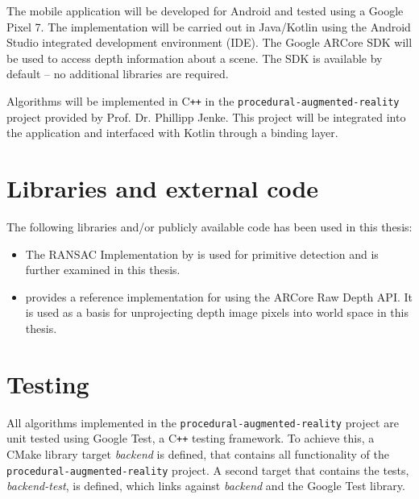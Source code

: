 The mobile application will be developed for Android and tested using a Google Pixel 7.
The implementation will be carried out in Java/Kotlin using the Android Studio integrated development environment (IDE).
The Google ARCore SDK will be used to access depth information about a scene.
The SDK is available by default -- no additional libraries are required.

Algorithms will be implemented in C\texttt{++} in the \texttt{procedural-augmented-reality} project provided by Prof. Dr. Phillipp Jenke.
This project will be integrated into the application and interfaced with Kotlin through a binding layer.

\section{Libraries and external code}
The following libraries and/or publicly available code has been used in this thesis:
\begin{itemize}
    \item The RANSAC Implementation by \citeauthor{schnabel_efficient_2007} is used for primitive detection
    and is further examined in this thesis. \parencite{schnabel_efficient_2007}
    \item {} provides a reference implementation for using the ARCore Raw Depth API.
    It is used as a basis for unprojecting depth image pixels into world space in this thesis.~\parencite{google_llc_codelab_raw_depth}
\end{itemize}

\section{Testing}

All algorithms implemented in the \texttt{procedural-augmented-reality} project are unit tested using
Google Test, a C\texttt{++} testing framework.
To achieve this, a CMake library target \textit{backend} is defined,
that contains all functionality of the \texttt{procedural-augmented-reality} project.
A second target that contains the tests, \textit{backend-test}, is defined,
which links against \textit{backend} and the Google Test library.
